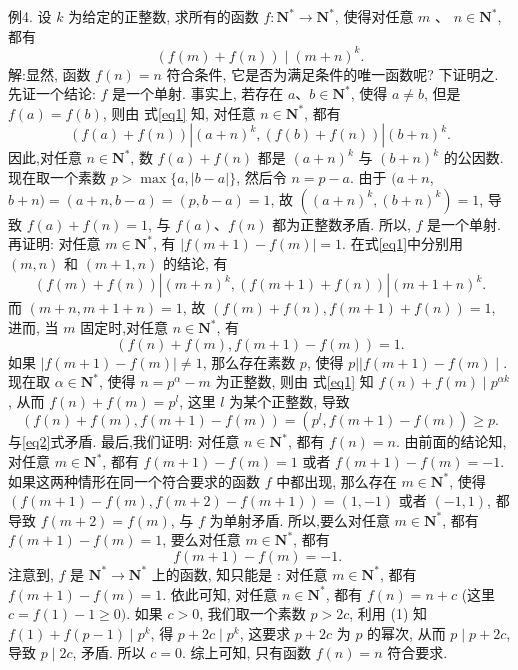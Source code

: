 例4. 设 $k$ 为给定的正整数, 求所有的函数 $f: \mathbf{N}^* \rightarrow \mathbf{N}^*$, 使得对任意 $m$ 、 $n \in \mathbf{N}^*$, 都有
$$
(f(m)+f(n)) \mid(m+n)^k . \label{eq1}
$$
解:显然, 函数 $f(n)=n$ 符合条件, 它是否为满足条件的唯一函数呢? 下证明之.
先证一个结论: $f$ 是一个单射.
事实上, 若存在 $a 、 b \in \mathbf{N}^*$, 使得 $a \neq b$, 但是 $f(a)=f(b)$, 则由 式\ref{eq1} 知, 对任意 $n \in \mathbf{N}^*$, 都有
$$
(f(a)+f(n))\left|(a+n)^k,(f(b)+f(n))\right|(b+n)^k .
$$
因此,对任意 $n \in \mathbf{N}^*$, 数 $f(a)+f(n)$ 都是 $(a+n)^k$ 与 $(b+n)^k$ 的公因数.
现在取一个素数 $p>\max \{a,|b-a|\}$, 然后令 $n=p-a$. 由于 $(a+n$, $b+n)=(a+n, b-a)=(p, b-a)=1$, 故 $\left((a+n)^k,(b+n)^k\right)=1$, 导致 $f(a)+f(n)=1$, 与 $f(a) 、 f(n)$ 都为正整数矛盾.
所以, $f$ 是一个单射.
再证明: 对任意 $m \in \mathbf{N}^*$, 有 $|f(m+1)-f(m)|=1$.
在式\ref{eq1}中分别用 $(m, n)$ 和 $(m+1, n)$ 的结论, 有
$$
(f(m)+f(n))\left|(m+n)^k,(f(m+1)+f(n))\right|(m+1+n)^k . 
$$
而 $(m+n, m+1+n)=1$, 故 $(f(m)+f(n), f(m+1)+f(n))=1$, 进而, 当 $m$ 固定时,对任意 $n \in \mathbf{N}^*$, 有
$$
(f(n)+f(m), f(m+1)-f(m))=1 . \label{eq2}
$$
如果 $|f(m+1)-f(m)| \neq 1$, 那么存在素数 $p$, 使得 $p|| f(m+1)- f(m) \mid$. 现在取 $\alpha \in \mathbf{N}^*$, 使得 $n=p^\alpha-m$ 为正整数, 则由 式\ref{eq1} 知 $f(n)+f(m) \mid p^{\alpha k}$, 从而 $f(n)+f(m)=p^l$, 这里 $l$ 为某个正整数, 导致
$$
(f(n)+f(m), f(m+1)-f(m))=\left(p^l, f(m+1)-f(m)\right) \geqslant p .
$$
与\ref{eq2}式矛盾.
最后,我们证明: 对任意 $n \in \mathbf{N}^*$, 都有 $f(n)=n$.
由前面的结论知, 对任意 $m \in \mathbf{N}^*$, 都有 $f(m+1)-f(m)=1$ 或者 $f(m+1)-f(m)=-1$. 如果这两种情形在同一个符合要求的函数 $f$ 中都出现, 那么存在 $m \in \mathbf{N}^*$, 使得 $(f(m+1)-f(m), f(m+2)-f(m+1))= (1,-1)$ 或者 $(-1,1)$, 都导致 $f(m+2)=f(m)$, 与 $f$ 为单射矛盾.
所以,要么对任意 $m \in \mathbf{N}^*$, 都有 $f(m+1)-f(m)=1$, 要么对任意 $m \in \mathbf{N}^*$, 都有
$$
f(m+1)-f(m)=-1 \text {. }
$$
注意到, $f$ 是 $\mathbf{N}^* \rightarrow \mathbf{N}^*$ 上的函数, 知只能是 : 对任意 $m \in \mathbf{N}^*$, 都有 $f(m+ 1)-f(m)=1$. 依此可知, 对任意 $n \in \mathbf{N}^*$, 都有 $f(n)=n+c$ (这里 $c= f(1)-1 \geqslant 0)$.
如果 $c>0$, 我们取一个素数 $p>2 c$, 利用 (1) 知 $f(1)+f(p-1) \mid p^k$, 得 $p+2 c \mid p^k$, 这要求 $p+2 c$ 为 $p$ 的幂次, 从而 $p \mid p+2 c$, 导致 $p \mid 2 c$, 矛盾.
所以 $c=0$.
综上可知, 只有函数 $f(n)=n$ 符合要求.


